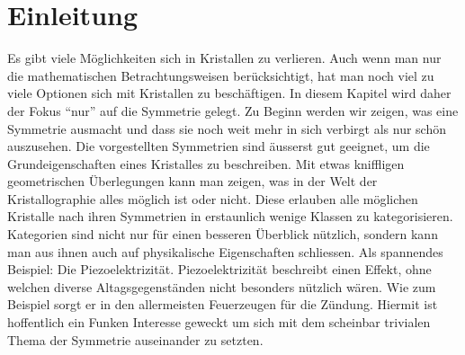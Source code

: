 \section{Einleitung}

Es gibt viele Möglichkeiten sich in Kristallen zu verlieren.
Auch wenn man nur die mathematischen Betrachtungsweisen berücksichtigt, hat man noch viel zu viele Optionen sich mit Kristallen zu beschäftigen.
In diesem Kapitel wird daher der Fokus ``nur'' auf die Symmetrie gelegt.
Zu Beginn werden wir zeigen, was eine Symmetrie ausmacht und dass sie noch weit mehr in sich verbirgt als nur schön auszusehen.
Die vorgestellten Symmetrien sind äusserst gut geeignet, um die Grundeigenschaften eines Kristalles zu beschreiben.
Mit etwas kniffligen geometrischen Überlegungen kann man zeigen, was in der Welt der Kristallographie alles möglich ist oder nicht.
Diese erlauben alle möglichen Kristalle nach ihren Symmetrien in erstaunlich wenige Klassen zu kategorisieren.
Kategorien sind nicht nur für einen besseren Überblick nützlich, sondern kann man aus ihnen auch auf physikalische Eigenschaften schliessen.
Als spannendes Beispiel: Die Piezoelektrizität.
Piezoelektrizität beschreibt einen Effekt, ohne welchen diverse Altagsgegenständen nicht besonders nützlich wären.
Wie zum Beispiel sorgt er in den allermeisten Feuerzeugen für die Zündung.
Hiermit ist hoffentlich ein Funken Interesse geweckt um sich mit dem scheinbar trivialen Thema der Symmetrie auseinander zu setzten.

